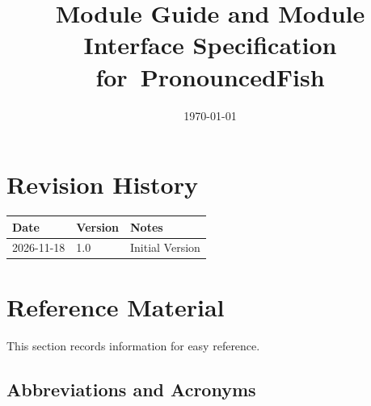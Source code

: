 \documentclass[12pt, titlepage]{article}
\begin{document}
\title{Module Guide and Module Interface Specification for~PronouncedFish}
\author{\authname}
\date{\today}

\maketitle


\section{Revision History}

\begin{tabularx}{\textwidth}{p{3cm}p{2cm}X}
\toprule {\bf Date} & {\bf Version} & {\bf Notes}\\
\midrule
2026-11-18 & 1.0 & Initial Version\\
\bottomrule
\end{tabularx}

\newpage

\section{Reference Material}

This section records information for easy reference.

\subsection{Abbreviations and Acronyms}
\end{document}
